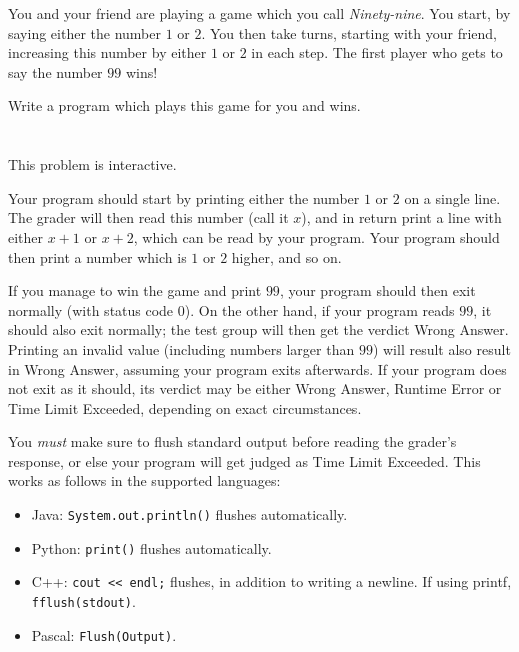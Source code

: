 \ifx\boi\undefined\fi
\def\version{jury-1}

You and your friend are playing a game which you call \emph{Ninety-nine}.
You start, by saying either the number $1$ or $2$.
You then take turns, starting with your friend, increasing this number by either $1$ or $2$ in each step.
The first player who gets to say the number $99$ wins!

Write a program which plays this game for you and wins.

\section*{\interactivity}
This problem is interactive.

Your program should start by printing either the number $1$ or $2$ on a single line.
The grader will then read this number (call it $x$), and in return print a line with either $x+1$ or $x+2$, which can be read by your program.
Your program should then print a number which is $1$ or $2$ higher, and so on.

If you manage to win the game and print $99$, your program should then exit normally (with status code 0).
On the other hand, if your program reads $99$, it should also exit normally; the test group will then get the verdict Wrong Answer.
Printing an invalid value (including numbers larger than $99$) will result also result in Wrong Answer, assuming your program exits afterwards.
If your program does not exit as it should, its verdict may be either Wrong Answer, Runtime Error or Time Limit Exceeded, depending on exact circumstances.

You \emph{must} make sure to flush standard output before reading the grader's response, or else your program
will get judged as Time Limit Exceeded. This works as follows in the supported languages:
\begin{itemize}
  \item Java: \texttt{System.out.println()} flushes automatically.
  \item Python: \texttt{print()} flushes automatically.
  \item C++: \texttt{cout << endl;} flushes, in addition to writing a newline. If using printf, \texttt{fflush(stdout)}.
  \item Pascal: \texttt{Flush(Output)}.
\end{itemize}

\section*{\constraints}
\testgroups

